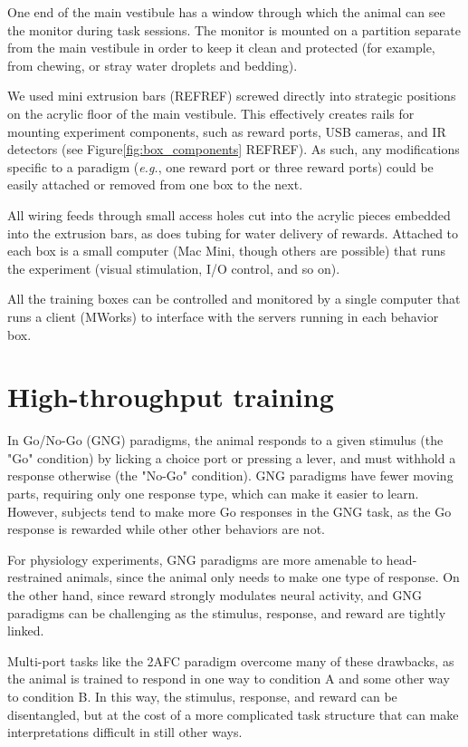 One end of the main vestibule has a window through which the animal can see the monitor during task sessions. The monitor is mounted on a partition separate from the main vestibule in order to keep it clean and protected (for example, from chewing, or stray water droplets and bedding). 

We used mini extrusion bars (REFREF) screwed directly into strategic positions on the acrylic floor of the main vestibule. This effectively creates rails for mounting experiment components, such as reward ports, USB cameras, and IR detectors (see Figure\ref{fig:box_components} REFREF). As such, any modifications specific to a paradigm (\textit{e.g.}, one reward port or three reward ports) could be easily attached or removed from one box to the next. 

All wiring feeds through small access holes cut into the acrylic pieces embedded into the extrusion bars, as does tubing for water delivery of rewards. Attached to each box is a small computer (Mac Mini, though others are possible) that runs the experiment (visual stimulation, I/O control, and so on). 

All the training boxes can be controlled and monitored by a single computer that runs a client (MWorks) to interface with the servers running in each behavior box. 

\section{High-throughput training}



In Go/No-Go (GNG) paradigms, the animal responds to a given stimulus (the "Go" condition) by licking a choice port or pressing a lever, and must withhold a response otherwise (the "No-Go" condition). GNG paradigms have fewer moving parts, requiring only one response type, which can make it easier to learn. However, subjects tend to make more Go responses in the GNG task, as the Go response is rewarded while other other behaviors are not\cite{REFREF}. 

For physiology experiments, GNG paradigms are more amenable to head-restrained animals, since the animal only needs to make one type of response. On the other hand, since reward strongly modulates neural activity, and GNG paradigms can be challenging as the stimulus, response, and reward are tightly linked\cite{REFREF}. 

Multi-port tasks like the 2AFC paradigm overcome many of these drawbacks, as the animal is trained to respond in one way to condition A and some other way to condition B. In this way, the stimulus, response, and reward can be disentangled, but at the cost of a more complicated task structure that can make interpretations difficult in still other ways. 

